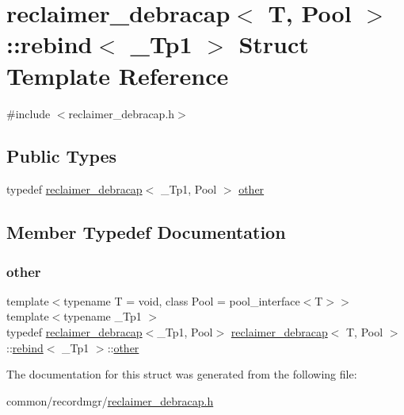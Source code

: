 \hypertarget{structreclaimer__debracap_1_1rebind}{}\section{reclaimer\+\_\+debracap$<$ T, Pool $>$\+:\+:rebind$<$ \+\_\+\+Tp1 $>$ Struct Template Reference}
\label{structreclaimer__debracap_1_1rebind}


{\ttfamily \#include $<$reclaimer\+\_\+debracap.\+h$>$}

\subsection*{Public Types}
\begin{DoxyCompactItemize}
\item 
typedef \hyperlink{classreclaimer__debracap}{reclaimer\+\_\+debracap}$<$ \+\_\+\+Tp1, Pool $>$ \hyperlink{structreclaimer__debracap_1_1rebind_a0e2eb262ce080be23925eb9209b37c53}{other}
\end{DoxyCompactItemize}


\subsection{Member Typedef Documentation}
\mbox{\label{structreclaimer__debracap_1_1rebind_a0e2eb262ce080be23925eb9209b37c53}} 
\subsubsection{\texorpdfstring{other}{other}}
{\footnotesize\ttfamily template$<$typename T  = void, class Pool  = pool\+\_\+interface$<$\+T$>$$>$ \\
template$<$typename \+\_\+\+Tp1 $>$ \\
typedef \hyperlink{classreclaimer__debracap}{reclaimer\+\_\+debracap}$<$\+\_\+\+Tp1, Pool$>$ \hyperlink{classreclaimer__debracap}{reclaimer\+\_\+debracap}$<$ T, Pool $>$\+::\hyperlink{structreclaimer__debracap_1_1rebind}{rebind}$<$ \+\_\+\+Tp1 $>$\+::\hyperlink{structreclaimer__debracap_1_1rebind_a0e2eb262ce080be23925eb9209b37c53}{other}}



The documentation for this struct was generated from the following file\+:\begin{DoxyCompactItemize}
\item 
common/recordmgr/\hyperlink{reclaimer__debracap_8h}{reclaimer\+\_\+debracap.\+h}\end{DoxyCompactItemize}
